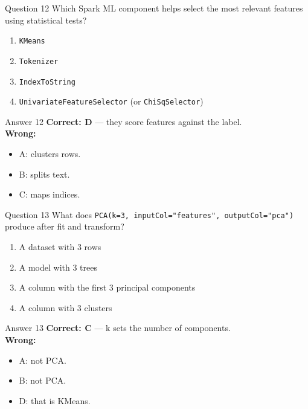 \documentclass[aspectratio=169,11pt]{beamer}
\begin{document}
\begin{frame}{Question 12}
Which Spark ML component helps select the most relevant features using statistical tests?
\begin{enumerate}[label=\Alph*.]
\item \texttt{KMeans}
\item \texttt{Tokenizer}
\item \texttt{IndexToString}
\item \texttt{UnivariateFeatureSelector} (or \texttt{ChiSqSelector})
\end{enumerate}
\end{frame}
\begin{frame}{Answer 12}
\textbf{Correct: D} --- they score features against the label.\\
\vspace{0.5em}
\textbf{Wrong:}
\begin{itemize}
\item A: clusters rows.
\item B: splits text.
\item C: maps indices.
\end{itemize}
\end{frame}

\begin{frame}{Question 13}
What does \texttt{PCA(k=3, inputCol="features", outputCol="pca")} produce after fit and transform?
\begin{enumerate}[label=\Alph*.]
\item A dataset with 3 rows
\item A model with 3 trees
\item A column with the first 3 principal components
\item A column with 3 clusters
\end{enumerate}
\end{frame}
\begin{frame}{Answer 13}
\textbf{Correct: C} --- k sets the number of components.\\
\vspace{0.5em}
\textbf{Wrong:}
\begin{itemize}
\item A: not PCA.
\item B: not PCA.
\item D: that is KMeans.
\end{itemize}
\end{frame}
\end{document}
